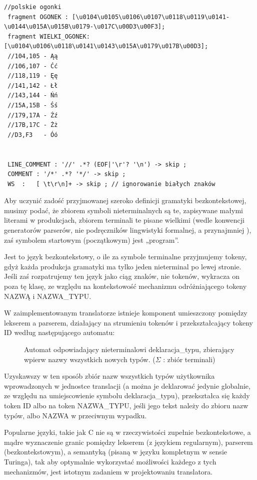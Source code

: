 \begin{lstlisting}[basicstyle=\scriptsize\ttfamily,breaklines=true]
//polskie ogonki
 fragment OGONEK : [\u0104\u0105\u0106\u0107\u0118\u0119\u0141-\u0144\u015A\u015B\u0179-\u017C\u00D3\u00F3];
 fragment WIELKI_OGONEK: [\u0104\u0106\u0118\u0141\u0143\u015A\u0179\u017B\u00D3];
 //104,105 - Ąą
 //106,107 - Ćć
 //118,119 - Ęę
 //141,142 - Łł
 //143,144 - Ńń
 //15A,15B - Śś
 //179,17A - Źź
 //17B,17C - Żż
 //D3,F3   - Óó


 LINE_COMMENT : '//' .*? (EOF|'\r'? '\n') -> skip ;
 COMMENT : '/*' .*? '*/' -> skip ;
 WS  :   [ \t\r\n]+ -> skip ; // ignorowanie białych znaków
\end{lstlisting}
\lstset{
    escapechar=|,
    breaklines=true
}
\restoregeometry %

Aby uczynić zadość przyjmowanej szeroko definicji gramatyki bezkontekstowej\cite[str.~158]{hopcroft_automaty}, musimy podać, że zbiorem symboli nieterminalnych są te, zapisywane małymi literami w produkcjach, zbiorem terminali te pisane wielkimi (wedle konwencji generatorów parserów, nie podręczników lingwistyki formalnej, a przynajmniej \cite{hopcroft_automaty}), zaś symbolem startowym (początkowym) jest „program”. 

Jest to język bezkontekstowy, o ile za symbole terminalne przyjmujemy tokeny, gdyż każda produkcja gramatyki ma tylko jeden nieterminal po lewej stronie. Jeśli zaś rozpatrujemy ten język jako ciąg znaków, nie tokenów, wykracza on poza tę klasę, ze względu na kontekstowość mechanizmu odróżniającego tokeny NAZWĄ i NAZWA\_TYPU.

W zaimplementowanym translatorze istnieje komponent umieszczony pomiędzy lekserem a parserem, działający na strumieniu tokenów i przekształcający tokeny ID według następującego automatu:

\begin{figure}[h]
    \centering
    
    \caption{Automat odpowiadający nieterminalowi deklaracja\_typu, zbierający wpierw nazwy wszystkich nowych typów. ($\Sigma$ : zbiór terminali) }
\end{figure}
Uzyskawszy w ten sposób zbiór nazw wszystkich typów użytkownika wprowadzonych w jednostce translacji (a można je deklarować jedynie globalnie, ze względu na umiejscowienie symbolu deklaracja\_typu), przekształca się każdy token ID albo na token NAZWA\_TYPU, jeśli jego tekst należy do zbioru nazw typów, albo NAZWA w przeciwnym wypadku.

Popularne języki, takie jak C nie są w rzeczywistości zupełnie bezkontekstowe, a mądre wyznaczenie granic pomiędzy lekserem (z językiem regularnym), parserem (bezkontekstowym), a semantyką (pisaną w języku kompletnym w sensie Turinga), tak aby optymalnie wykorzystać możliwości każdego z tych mechanizmów, jest istotnym zadaniem w projektowaniu translatora.\cite{DRAGON_BOOK}

